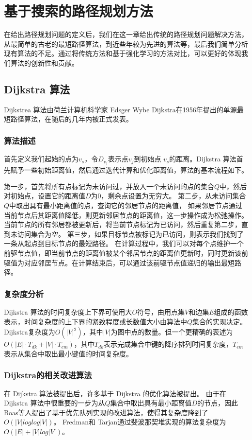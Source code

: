 \documentclass{standalone}
\begin{document}
\chapter{基于搜索的路径规划方法}
在给出路径规划问题的定义后，我们在这一章给出传统的路径规划问题解决方法，从最简单的古老的最短路径算法，到近些年较为先进的算法等，最后我们简单分析现有算法的不足。通过将传统方法和基于强化学习的方法对比，可以更好的体现我们算法的创新性和贡献。
\section{Dijkstra 算法}
Dijkstrea 算法由荷兰计算机科学家 Edsger Wybe Dijkstra在1956年提出的单源最短路径算法，在随后的几年内被正式发表。
\subsection{算法描述}
首先定义我们起始的点为$v_s$，令$D_{v_j}$表示点$v_j$到初始点 $v_s$的距离。Dijkstra 算法首先赋予一些初始距离值，然后通过迭代计算和优化距离值，算法的基本流程如下。\par
第一步，首先将所有点标记为未访问过，并放入一个未访问的点的集合$Q$中，然后对初始点，设置它的距离值$D$为0，剩余点设置为无穷大。
第二步，从未访问集合$Q$中取出具有最小距离值的点，查询它的邻居节点的距离值，
如果邻居节点通过当前节点后其距离值降低，则更新邻居节点的距离值，这一步操作成为松弛操作。当前节点的所有邻居都被更新后，将当前节点标记为已访问，然后重复第二步，直到未访问集合为空。
第三步，如果目标节点被标记为已访问，则表示我们找到了一条从起点到目标节点的最短路径。
在计算过程中，我们可以对每个点维护一个前驱节点值，即当前节点的距离值被某个邻居节点的距离值更新时，同时更新该前驱值为对应邻居节点。在计算结束后，可以通过该前驱节点值递归的输出最短路径。
\subsection{复杂度分析}
Dijkstra 算法的时间复杂度上下界可使用大$O$符号，由用点集$V$和边集$E$组成的函数表示，时间复杂度的上下界的紧致程度或长数值大小由算法中$Q$集合的实现决定。Dijkstra复杂度为$O(|V|^2)$，其中$|V|$为图中点的数量。但一个更精确的表述为 $O(|E|\cdot T_{dk} + |V|\cdot T_{em})$，其中$T_{dk}$表示完成集合中键的降序排列时间复杂度，$T_{em}$表示从集合中取出最小键值的时间复杂度。
\subsection{Dijkstra的相关改进算法}
在 Dijkstra 算法被提出后，许多基于 Dijkstra 的优化算法被提出。
由于在 Dijkstra 算法中很重要的一步为从$Q$集合中取出具有最小距离值$D$的节点，因此Boas等人提出了基于优先队列实现的改进算法，使得其复杂度降到了$O(|V|loglog|V|)$。
Fredman和 Tarjan通过斐波那契堆实现的算法复杂度为$O(|E| + |V|log|V|)$。
\end{document}
